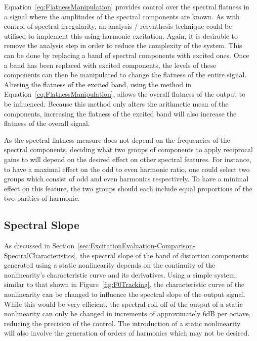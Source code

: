 		Equation~\ref{eq:FlatnessManipulation} provides control over the spectral flatness in a signal where the
		amplitudes of the spectral components are known. As with control of spectral irregularity, an analysis /
		resynthesis technique could be utilised to implement this using harmonic excitation.  Again, it is
		desirable to remove the analysis step in order to reduce the complexity of the system.  This can be done by
		replacing a band of spectral components with excited ones. Once a band has been replaced with excited
		components, the levels of these components can then be manipulated to change the flatness of the entire
		signal. Altering the flatness of the excited band, using the method in
		Equation~\ref{eq:FlatnessManipulation}, allows the overall flatness of the output to be influenced. Because
		this method only alters the arithmetic mean of the components, increasing the flatness of the excited band
		will also increase the flatness of the overall signal.

		As the spectral flatness measure does not depend on the frequencies of the spectral components, deciding
		what two groups of components to apply reciprocal gains to will depend on the desired effect on other
		spectral features. For instance, to have a maximal effect on the odd to even harmonic ratio, one could
		select two groups which consist of odd and even harmonics respectively. To have a minimal effect on this
		feature, the two groups should each include equal proportions of the two parities of harmonic.

	\subsection{Spectral Slope}
	\label{sec:FeatureControl-Parameterisation-Slope}
		As discussed in Section~\ref{sec:ExcitationEvaluation-Comparison-SpectralCharacteristics}, the spectral
		slope of the band of distortion components generated using a static nonlinearity depends on the continuity
		of the nonlinearity's characteristic curve and its derivatives. Using a simple system, similar to that
		shown in Figure~\ref{fig:F0Tracking}, the characteristic curve of the nonlinearity can be changed to
		influence the spectral slope of the output signal. While this would be very efficient, the spectral roll
		off of the output of a static nonlinearity can only be changed in increments of approximately 6dB per
		octave, reducing the precision of the control. The introduction of a static nonlinearity will also involve
		the generation of orders of harmonics which may not be desired.

